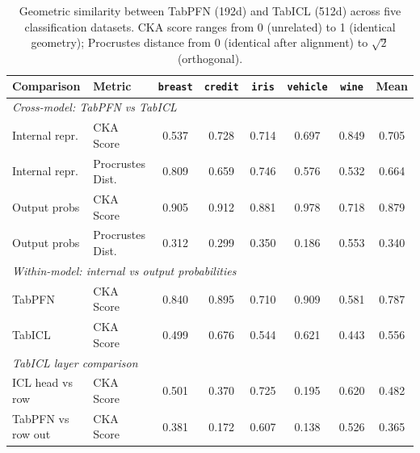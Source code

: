 \begin{table}[t]
\centering
\caption{Geometric similarity between TabPFN (192d) and TabICL (512d) across five classification datasets.
CKA score ranges from 0 (unrelated) to 1 (identical geometry); Procrustes distance from 0 (identical after alignment) to $\sqrt{2}$ (orthogonal).}
\label{tab:geometric-sweep}
\small
\begin{tabular}{llcccccc}
\toprule
Comparison & Metric & \texttt{breast} & \texttt{credit} & \texttt{iris} & \texttt{vehicle} & \texttt{wine} & Mean \\
\midrule
\multicolumn{8}{l}{\textit{Cross-model: TabPFN vs TabICL}} \\
Internal repr. & CKA Score & 0.537 & 0.728 & 0.714 & 0.697 & 0.849 & 0.705 \\
Internal repr. & Procrustes Dist. & 0.809 & 0.659 & 0.746 & 0.576 & 0.532 & 0.664 \\
Output probs & CKA Score & 0.905 & 0.912 & 0.881 & 0.978 & 0.718 & 0.879 \\
Output probs & Procrustes Dist. & 0.312 & 0.299 & 0.350 & 0.186 & 0.553 & 0.340 \\
\midrule
\multicolumn{8}{l}{\textit{Within-model: internal vs output probabilities}} \\
TabPFN & CKA Score & 0.840 & 0.895 & 0.710 & 0.909 & 0.581 & 0.787 \\
TabICL & CKA Score & 0.499 & 0.676 & 0.544 & 0.621 & 0.443 & 0.556 \\
\midrule
\multicolumn{8}{l}{\textit{TabICL layer comparison}} \\
ICL head vs row & CKA Score & 0.501 & 0.370 & 0.725 & 0.195 & 0.620 & 0.482 \\
TabPFN vs row out & CKA Score & 0.381 & 0.172 & 0.607 & 0.138 & 0.526 & 0.365 \\
\bottomrule
\end{tabular}
\end{table}

